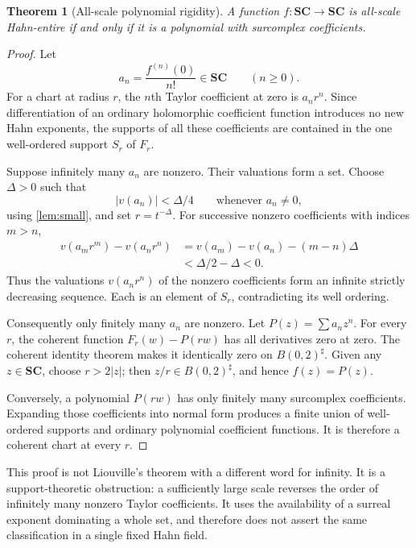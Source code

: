 \documentclass[11pt,letterpaper]{article}
\newtheorem{theorem}{Theorem}[section]
\theoremstyle{definition}
\theoremstyle{remark}
\newcommand{\SC}{\mathbf{SC}}
\newcommand{\sh}{^{\sharp}}
\numberwithin{equation}{section}
\begin{document}
\begin{theorem}[All-scale polynomial rigidity]\label{thm:rigidity}
A function $f:\SC\to\SC$ is all-scale Hahn-entire if and only if it is a polynomial with surcomplex coefficients.
\end{theorem}
\begin{proof}
Let
\[
 a_n=\frac{f^{(n)}(0)}{n!}\in\SC\qquad(n\ge0).
\]
For a chart at radius $r$, the $n$th Taylor coefficient at zero is $a_nr^n$. Since differentiation of an ordinary holomorphic coefficient function introduces no new Hahn exponents, the supports of all these coefficients are contained in the one well-ordered support $S_r$ of $F_r$.

Suppose infinitely many $a_n$ are nonzero. Their valuations form a set. Choose $\Delta>0$ such that
\[
 |v(a_n)|<\Delta/4\qquad\text{whenever }a_n\ne0,
\]
using \cref{lem:small}, and set $r=t^{-\Delta}$. For successive nonzero coefficients with indices $m>n$,
\begin{align*}
 v(a_mr^m)-v(a_nr^n)
 &=v(a_m)-v(a_n)-(m-n)\Delta\\
 &<\Delta/2-\Delta<0.
\end{align*}
Thus the valuations $v(a_nr^n)$ of the nonzero coefficients form an infinite strictly decreasing sequence. Each is an element of $S_r$, contradicting its well ordering.

Consequently only finitely many $a_n$ are nonzero. Let $P(z)=\sum a_nz^n$. For every $r$, the coherent function $F_r(w)-P(rw)$ has all derivatives zero at zero. The coherent identity theorem makes it identically zero on $B(0,2)\sh$. Given any $z\in\SC$, choose $r>2|z|$; then $z/r\in B(0,2)\sh$, and hence $f(z)=P(z)$.

Conversely, a polynomial $P(rw)$ has only finitely many surcomplex coefficients. Expanding those coefficients into normal form produces a finite union of well-ordered supports and ordinary polynomial coefficient functions. It is therefore a coherent chart at every $r$.
\end{proof}
This proof is not Liouville's theorem with a different word for infinity. It is a support-theoretic obstruction: a sufficiently large scale reverses the order of infinitely many nonzero Taylor coefficients. It uses the availability of a surreal exponent dominating a whole set, and therefore does not assert the same classification in a single fixed Hahn field.
\end{document}
